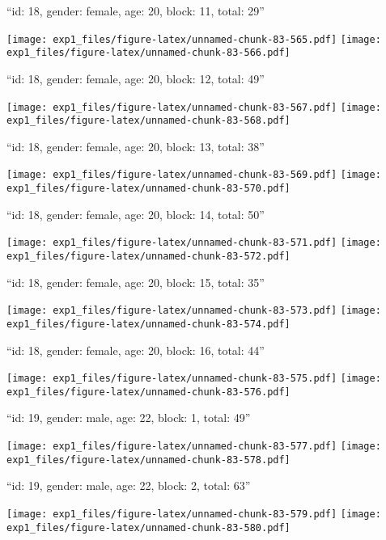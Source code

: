 \documentclass[11pt,,]{article}
\begin{document}
\newpage
[1] 

``id: 18, gender: female, age: 20, block: 11, total: 29''

\texttt{[image: exp1\_files/figure-latex/unnamed-chunk-83-565.pdf]}
\texttt{[image: exp1\_files/figure-latex/unnamed-chunk-83-566.pdf]}

\newpage
[1] 

``id: 18, gender: female, age: 20, block: 12, total: 49''

\texttt{[image: exp1\_files/figure-latex/unnamed-chunk-83-567.pdf]}
\texttt{[image: exp1\_files/figure-latex/unnamed-chunk-83-568.pdf]}

\newpage
[1] 

``id: 18, gender: female, age: 20, block: 13, total: 38''

\texttt{[image: exp1\_files/figure-latex/unnamed-chunk-83-569.pdf]}
\texttt{[image: exp1\_files/figure-latex/unnamed-chunk-83-570.pdf]}

\newpage
[1] 

``id: 18, gender: female, age: 20, block: 14, total: 50''

\texttt{[image: exp1\_files/figure-latex/unnamed-chunk-83-571.pdf]}
\texttt{[image: exp1\_files/figure-latex/unnamed-chunk-83-572.pdf]}

\newpage
[1] 

``id: 18, gender: female, age: 20, block: 15, total: 35''

\texttt{[image: exp1\_files/figure-latex/unnamed-chunk-83-573.pdf]}
\texttt{[image: exp1\_files/figure-latex/unnamed-chunk-83-574.pdf]}

\newpage
[1] 

``id: 18, gender: female, age: 20, block: 16, total: 44''

\texttt{[image: exp1\_files/figure-latex/unnamed-chunk-83-575.pdf]}
\texttt{[image: exp1\_files/figure-latex/unnamed-chunk-83-576.pdf]}

\newpage
[1] 

``id: 19, gender: male, age: 22, block: 1, total: 49''

\texttt{[image: exp1\_files/figure-latex/unnamed-chunk-83-577.pdf]}
\texttt{[image: exp1\_files/figure-latex/unnamed-chunk-83-578.pdf]}

\newpage
[1] 

``id: 19, gender: male, age: 22, block: 2, total: 63''

\texttt{[image: exp1\_files/figure-latex/unnamed-chunk-83-579.pdf]}
\texttt{[image: exp1\_files/figure-latex/unnamed-chunk-83-580.pdf]}
\end{document}
